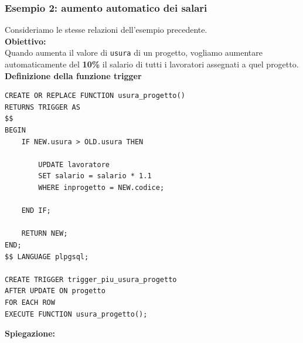\subsubsection{Esempio 2: aumento automatico dei salari}
Consideriamo le stesse relazioni dell'esempio precedente.\\
\textbf{Obiettivo:}\\
Quando aumenta il valore di \texttt{usura}
di un progetto, vogliamo aumentare automaticamente
del \textbf{10\%} il salario di tutti i lavoratori
assegnati a quel progetto.\medskip\\
\textbf{Definizione della funzione trigger}
\begin{verbatim}
CREATE OR REPLACE FUNCTION usura_progetto()
RETURNS TRIGGER AS
$$
BEGIN
    IF NEW.usura > OLD.usura THEN

        UPDATE lavoratore
        SET salario = salario * 1.1
        WHERE inprogetto = NEW.codice;

    END IF;

    RETURN NEW;
END;
$$ LANGUAGE plpgsql;

CREATE TRIGGER trigger_piu_usura_progetto
AFTER UPDATE ON progetto
FOR EACH ROW
EXECUTE FUNCTION usura_progetto();
\end{verbatim}
\noindent
\textbf{Spiegazione:}
